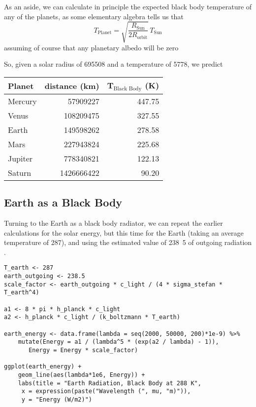 \documentclass[10pt,a4paper,titlepage]{article}
\begin{document}
As an aside, we can calculate in principle the expected black body
temperature of any of the planets, as some elementary algebra tells us
that
\begin{equation}
T_{\mathrm{Planet}} = \sqrt{\frac{R_{\mathrm{Sun}}}{2 R_{\mathrm{orbit}}}} \, T_{\mathrm{Sun}}
\end{equation}
assuming of course that any planetary albedo will be zero

So, given a solar radius of \unit{695508}{\kilo\metre} and a
temperature of \unit{5778}{\kelvin}, we predict

\begin{center}
\begin{tabular}{lrr}
\toprule
Planet & distance (km) & T$_{\text{Black Body}}$ (K)\\
\midrule
Mercury & 57909227 & 447.75\\
Venus & 108209475 & 327.55\\
Earth & 149598262 & 278.58\\
Mars & 227943824 & 225.68\\
Jupiter & 778340821 & 122.13\\
Saturn & 1426666422 & 90.20\\
\bottomrule
\end{tabular}
\end{center}

\subsection{Earth as a Black Body}
\label{sec-3-3}
Turning to the Earth as a black body radiator, we can repeat the
earlier calculations for the solar energy, but this time for the Earth
(taking an average temperature of \unit{287}{\kelvin}), and using the
estimated value of \unit{238.5}{\watt\per\metre\squared} of outgoing
radiation \citep{trenberth-al09:budget}.
\begin{lstlisting}
T_earth <- 287
earth_outgoing <- 238.5
scale_factor <- earth_outgoing * c_light / (4 * sigma_stefan * T_earth^4)

a1 <- 8 * pi * h_planck * c_light
a2 <- h_planck * c_light / (k_boltzmann * T_earth)

earth_energy <- data.frame(lambda = seq(2000, 50000, 200)*1e-9) %>%
    mutate(Energy = a1 / (lambda^5 * (exp(a2 / lambda) - 1)),
	   Energy = Energy * scale_factor)

ggplot(earth_energy) +
    geom_line(aes(lambda*1e6, Energy)) +
    labs(title = "Earth Radiation, Black Body at 288 K",
	 x = expression(paste("Wavelength (", mu, "m)")),
	 y = "Energy (W/m2)")
\end{lstlisting}
\end{document}
